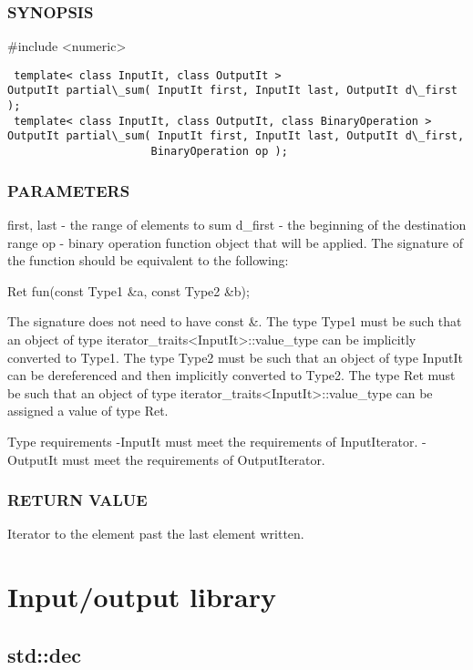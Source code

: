 \subsubsection{SYNOPSIS}
\#include <numeric>

\begin{lstlisting}
 template< class InputIt, class OutputIt >
OutputIt partial\_sum( InputIt first, InputIt last, OutputIt d\_first );
 template< class InputIt, class OutputIt, class BinaryOperation >
OutputIt partial\_sum( InputIt first, InputIt last, OutputIt d\_first,
                      BinaryOperation op );
\end{lstlisting}

\subsubsection{PARAMETERS}
first, last - the range of elements to sum
d\_first - the beginning of the destination range
op - binary operation function object that will be applied.
The signature of the function should be equivalent to the following:

 Ret fun(const Type1 \&a, const Type2 \&b);

The signature does not need to have const \&. The type Type1 must be such that an object of type iterator\_traits<InputIt>::value\_type can be implicitly converted to Type1. The type Type2 must be such that an object of type InputIt can be dereferenced and then implicitly converted to Type2. The type Ret must be such that an object of type iterator\_traits<InputIt>::value\_type can be assigned a value of type Ret.

 Type requirements
 -InputIt must meet the requirements of InputIterator.
 -OutputIt must meet the requirements of OutputIterator.

\subsubsection{RETURN VALUE}
Iterator to the element past the last element written.



\section{Input/output library}

\subsection{std::dec}

